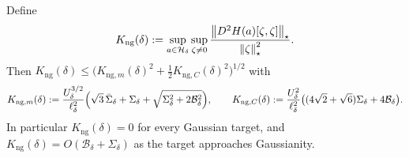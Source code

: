 \begin{lemma}
\label{lem:Kng}
Define
\[
    K_{\mathrm{ng}}(\delta):=\sup_{a\in\mathcal{H}_\delta}\sup_{\zeta\neq0}
    \frac{\left\lVert D^2H(a)[\zeta,\zeta]\right\rVert_\star}{\left\lVert \zeta\right\rVert_\star^2}.
\]
Then $K_{\mathrm{ng}}(\delta)\leq\bigl(K_{\mathrm{ng},m}(\delta)^2+\tfrac12K_{\mathrm{ng},C}(\delta)^2\bigr)^{1/2}$
with
\[
    K_{\mathrm{ng},m}(\delta):=\frac{U_\delta^{3/2}}{\ell_\delta^2}
    \Bigl(\sqrt3\,\bar\Sigma_\delta+\Sigma_\delta+\sqrt{\Sigma_\delta^2+2\mathcal B_\delta^2}\Bigr),
    \qquad
    K_{\mathrm{ng},C}(\delta):=\frac{U_\delta^2}{\ell_\delta^2}
    \bigl((4\sqrt2+\sqrt6)\Sigma_\delta+4\mathcal B_\delta\bigr).
\]
In particular $K_{\mathrm{ng}}(\delta)=0$ for every Gaussian target, and
$K_{\mathrm{ng}}(\delta)=O(\mathcal B_\delta+\Sigma_\delta)$ as the target approaches
Gaussianity.
\end{lemma}

